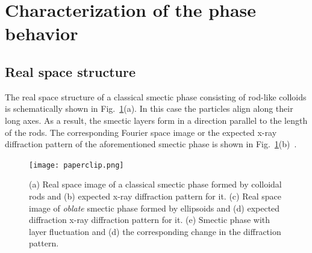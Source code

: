 \documentclass[aip,graphicx]{revtex4-1} %
\begin{document}
\section{Characterization of the phase behavior}

\subsection{Real space structure}


The real space structure of a classical smectic phase consisting of rod-like colloids is schematically shown in Fig.~\ref{paperclip}(a). In this case the
particles align along their long  axes. As a result, the smectic layers form in a direction parallel to the length of the rods. The corresponding Fourier space
image or the expected x-ray diffraction pattern of the aforementioned smectic phase is shown in Fig.~\ref{paperclip}(b)~\cite{kuijk2012phase, byelov2013situ}.
\begin{figure}[]
\centering
\texttt{[image: paperclip.png]}
\caption{(a) Real space image of a classical smectic phase formed by colloidal rods and (b) expected x-ray diffraction pattern for it. (c) Real space image of \textit{oblate} smectic phase formed by ellipsoids and (d) expected diffraction x-ray diffraction pattern for it. (e) Smectic phase with layer fluctuation and (d) the corresponding change in the diffraction pattern.}\label{paperclip}
\end{figure}
\end{document}
